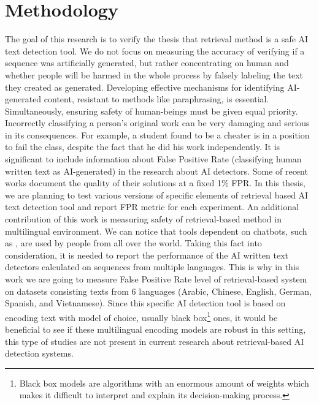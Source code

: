 \documentclass[12pt]{report}
\begin{document}
\chapter{Methodology}
\label{chapter:methodology}
The goal of this research is to verify the thesis that retrieval method is a safe AI text detection tool. We do not focus on measuring the accuracy of verifying if a sequence was artificially generated, but rather concentrating on human and whether people will be harmed in the whole process by falsely labeling the text they created as generated. Developing effective mechanisms for identifying AI-generated content, resistant to methods like paraphrasing, is essential. Simultaneously, ensuring safety of human-beings must be given equal priority. Incorrectly classifying a person's original work can be very damaging and serious in its consequences. For example, a student found to be a cheater is in a position to fail the class, despite the fact that he did his work independently. It is significant to include information about False Positive Rate (classifying human written text as AI-generated) in the research about AI detectors. Some of recent works \citep{krishna2023paraphrasing, yang2023dnagpt} document the quality of their solutions at a fixed 1\% FPR. In this thesis, we are planning to test various versions of specific elements of retrieval based AI text detection tool and report FPR metric for each experiment. \newline \newline               
An additional contribution of this work is measuring safety of retrieval-based method in multilingual environment. We can notice that tools dependent on chatbots, such as \cite{ChatGPT}, are used by people from all over the world. Taking this fact into consideration, it is needed to report the performance of the AI written text detectors calculated on sequences from multiple languages. This is why in this work we are going to measure False Positive Rate level of retrieval-based system on datasets consisting texts from 6 languages (Arabic, Chinese, English, German, Spanish, and Vietnamese). Since this specific AI detection tool is based on encoding text with model of choice, usually black box\footnote{Black box models are algorithms with an enormous amount of weights which makes it difficult to interpret and explain its decision-making process.} ones, it would be beneficial to see if these multilingual encoding models are robust in this setting, this type of studies are not present in current research about retrieval-based AI detection systems.
\end{document}
